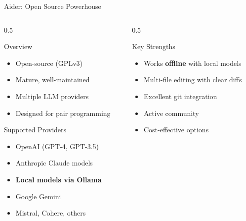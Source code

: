 \documentclass[aspectratio=169,11pt]{beamer}
\begin{document}
\begin{frame}{Aider: Open Source Powerhouse}
    \begin{columns}[T]
        \begin{column}{0.5\textwidth}
            \begin{block}{Overview}
                \begin{itemize}
                    \item Open-source (GPLv3)
                    \item Mature, well-maintained
                    \item Multiple LLM providers
                    \item Designed for pair programming
                \end{itemize}
            \end{block}

            \begin{block}{Supported Providers}
                \begin{itemize}
                    \item OpenAI (GPT-4, GPT-3.5)
                    \item Anthropic Claude models
                    \item \textbf{Local models via Ollama}
                    \item Google Gemini
                    \item Mistral, Cohere, others
                \end{itemize}
            \end{block}
        \end{column}
        \begin{column}{0.5\textwidth}
            \begin{exampleblock}{Key Strengths}
                \begin{itemize}
                    \item Works \textbf{offline} with local models
                    \item Multi-file editing with clear diffs
                    \item Excellent git integration
                    \item Active community
                    \item Cost-effective options
                \end{itemize}
            \end{exampleblock}


\end{column}
\end{columns}
\end{frame}
\end{document}
